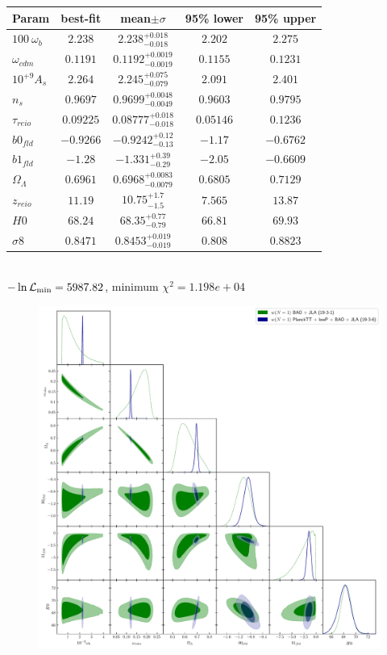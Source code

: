 \documentclass[a4paper,10pt]{article}
\begin{document}
\begin{tabular}{|l|c|c|c|c|} 
 \hline 
Param & best-fit & mean$\pm\sigma$ & 95\% lower & 95\% upper \\ \hline 
$100~\omega_{b }$ &$2.238$ & $2.238_{-0.018}^{+0.018}$ & $2.202$ & $2.275$ \\ 
$\omega_{cdm }$ &$0.1191$ & $0.1192_{-0.0019}^{+0.0019}$ & $0.1155$ & $0.1231$ \\ 
$10^{+9}A_{s }$ &$2.264$ & $2.245_{-0.079}^{+0.075}$ & $2.091$ & $2.401$ \\ 
$n_{s }$ &$0.9697$ & $0.9699_{-0.0049}^{+0.0048}$ & $0.9603$ & $0.9795$ \\ 
$\tau_{reio }$ &$0.09225$ & $0.08777_{-0.018}^{+0.018}$ & $0.05146$ & $0.1236$ \\ 
$b0_{fld }$ &$-0.9266$ & $-0.9242_{-0.13}^{+0.12}$ & $-1.17$ & $-0.6762$ \\ 
$b1_{fld }$ &$-1.28$ & $-1.331_{-0.29}^{+0.39}$ & $-2.05$ & $-0.6609$ \\ 
$\Omega_{\Lambda }$ &$0.6961$ & $0.6968_{-0.0079}^{+0.0083}$ & $0.6805$ & $0.7129$ \\ 
$z_{reio }$ &$11.19$ & $10.75_{-1.5}^{+1.7}$ & $7.565$ & $13.87$ \\ 
$H0$ &$68.24$ & $68.35_{-0.79}^{+0.77}$ & $66.81$ & $69.93$ \\ 
$\sigma8$ &$0.8471$ & $0.8453_{-0.019}^{+0.019}$ & $0.808$ & $0.8823$ \\ 
\hline 
 \end{tabular} \\ 
$-\ln{\cal L}_\mathrm{min} =5987.82$, minimum $\chi^2=1.198e+04$ \\ 


\begin{figure}[h]
 \centering
 \includegraphics[scale=0.6]{N1_experiments_march.pdf}
\end{figure}
\end{document}

